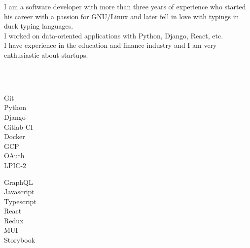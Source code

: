 \documentclass[9pt]{developercv}
\begin{document}
\begin{minipage}[t]{1\textwidth}
	\vspace{-\baselineskip}
	I am a software developer with more than three years of experience who started his career with a passion for GNU/Linux and later fell in love with typings in duck typing languages.\\
	I worked on data-oriented applications with Python, Django, React, etc. \\
	I have experience in the education and finance industry and I am very enthusiastic about startups.
\end{minipage}

\\\\
\begin{minipage}[t]{0.49\textwidth}
	\Large
	\vspace{-\baselineskip}

	\faCircle \; {Git}\\
	\faCircle \; {Python}\\
	\faCircle \; {Django}\\
	\faCircle \; {Gitlab-CI}\\
	\faCircle \; {Docker}\\
	\faCircle \; {GCP}\\
	\faCircle \; {OAuth}\\
	\faCircle \; {LPIC-2}\\
\end{minipage}
\begin{minipage}[t]{0.50\textwidth}
	\Large
	\vspace{-\baselineskip}

	\faCircle \; {GraphQL}\\
	\faCircle \; {Javascript}\\
	\faCircle \; {Typescript}\\
	\faCircle \; {React}\\
	\faCircle \; {Redux}\\
	\faCircle \; {MUI}\\
	\faCircle \; {Storybook}\\
\end{minipage}
\end{document}
